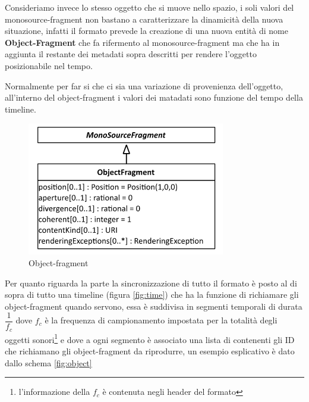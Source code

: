 \documentclass[12pt,a4paper]{report}
\begin{document}
Consideriamo invece lo stesso oggetto che si muove nello spazio, i soli valori del monosource-fragment non bastano a caratterizzare la dinamicità della nuova situazione, infatti il formato prevede la creazione di una nuova entità di nome \textbf{Object-Fragment} che fa rifermento al monosource-fragment ma che ha in aggiunta il restante dei metadati sopra descritti per rendere l'oggetto posizionabile nel tempo.

Normalmente per far si che ci sia una variazione di provenienza dell'oggetto, all'interno del object-fragment i valori dei matadati sono funzione del tempo della timeline.

\begin{figure}[htbp]
	\centering
	\includegraphics[scale=0.50]{figures/object-fragment.png}
	\caption {Object-fragment}
	\label{fig:of}
	\end{figure}
	 
Per quanto riguarda la parte la sincronizzazione di tutto il formato è posto al di sopra di tutto una timeline (figura \ref{fig:time}) che ha la funzione di richiamare gli object-fragment quando servono, essa è suddivisa in segmenti temporali di durata $\dfrac{1}{f_c}$ dove $f_c$ è la frequenza di campionamento impostata per la totalità degli oggetti sonori\footnote{l'informazione della $f_c$ è contenuta negli header del formato} e dove a ogni segmento è associato una lista di contenenti gli ID che richiamano gli object-fragment da riprodurre, un esempio esplicativo è dato dallo schema \ref{fig:object}
\end{document}
